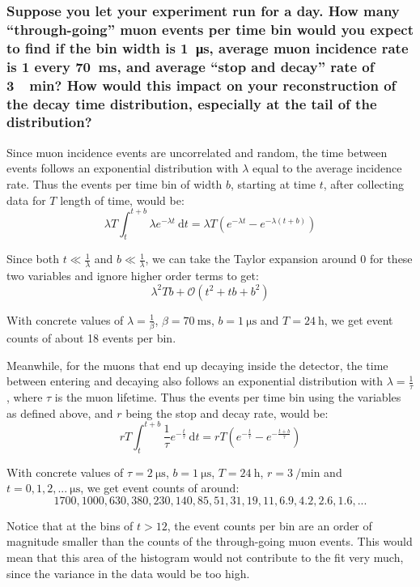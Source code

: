 \documentclass[a4paper]{scrartcl}
\begin{document}
\subsubsection{Suppose you let your experiment run for a day. How many ``through-going'' muon events per time bin would you expect to find if the bin width is \SI{1}{\micro\second}, average muon incidence rate is 1 every \SI{70}{\milli\second}, and average ``stop and decay'' rate of \SI{3}{\per\minute}? How would this impact on your reconstruction of the decay time distribution, especially at the tail of the distribution?}
Since muon incidence events are uncorrelated and random, the time between events follows an exponential distribution with \(\lambda\) equal to the average incidence rate. Thus the events per time bin of width \(b\), starting at time \(t\), after collecting data for \(T\) length of time, would be:
\[\lambda T \int_t^{t + b} \lambda e^{-\lambda t} \:\mathrm{d}t = \lambda T \left(e^{-\lambda t} - e^{-\lambda (t + b)}\right)\]

Since both \(t \ll \frac{1}{\lambda}\) and \(b \ll \frac{1}{\lambda}\), we can take the Taylor expansion around 0 for these two variables and ignore higher order terms to get:
\[\lambda^2 T b + \mathcal{O}(t^2 + t b + b^2)\]

With concrete values of \(\lambda = \frac{1}{\beta}\), \(\beta = \SI{70}{\milli\second}\), \(b = \SI{1}{\micro\second}\) and \(T = \SI{24}{\hour}\), we get event counts of about 18 events per bin.

Meanwhile, for the muons that end up decaying inside the detector, the time between entering and decaying also follows an exponential distribution with \(\lambda = \frac{1}{\tau}\), where \(\tau\) is the muon lifetime. Thus the events per time bin using the variables as defined above, and \(r\) being the stop and decay rate, would be:
\[r T \int_t^{t + b} \frac{1}{\tau} e^{-\frac{t}{\tau}} \:\mathrm{d}t = r T \left(e^{-\frac{t}{\tau}} - e^{-\frac{t + b}{\tau}}\right)\]

With concrete values of \(\tau = \SI{2}{\micro\second}\), \(b = \SI{1}{\micro\second}\), \(T = \SI{24}{\hour}\), \(r = \SI{3}{\per\minute}\) and \(t = 0, 1, 2, ... \:\si{\micro\second}\), we get event counts of around:
\[1700, 1000, 630, 380, 230, 140, 85, 51, 31, 19, 11, 6.9, 4.2, 2.6, 1.6, ...\]

Notice that at the bins of \(t > 12\), the event counts per bin are an order of magnitude smaller than the counts of the through-going muon events. This would mean that this area of the histogram would not contribute to the fit very much, since the variance in the data would be too high.
\end{document}
